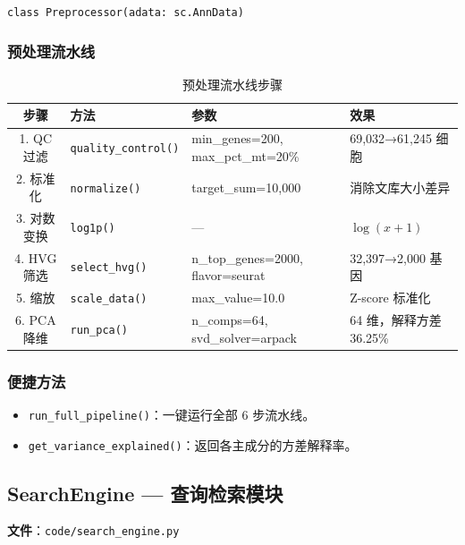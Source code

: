 \documentclass[12pt,a4paper]{ctexart}
\begin{document}
\texttt{class Preprocessor(adata: sc.AnnData)}

\subsubsection{预处理流水线}

\begin{table}[H]
\centering
\caption{预处理流水线步骤}
{\small
\begin{tabular}{c|l|l|p{4cm}}
\toprule
\textbf{步骤} & \textbf{方法} & \textbf{参数} & \textbf{效果} \\
\midrule
1. QC 过滤    & \texttt{quality\_control()} & {\small min\_genes=200, max\_pct\_mt=20\%} & 69,032→61,245 细胞 \\
2. 标准化     & \texttt{normalize()}        & {\small target\_sum=10,000}               & 消除文库大小差异 \\
3. 对数变换   & \texttt{log1p()}            & —                                          & $\log(x+1)$ \\
4. HVG 筛选   & \texttt{select\_hvg()}      & {\small n\_top\_genes=2000, flavor=seurat} & 32,397→2,000 基因 \\
5. 缩放       & \texttt{scale\_data()}       & {\small max\_value=10.0}                   & Z-score 标准化 \\
6. PCA 降维   & \texttt{run\_pca()}          & {\small n\_comps=64, svd\_solver=arpack}   & 64 维，解释方差 36.25\% \\
\bottomrule
\end{tabular}
}
\end{table}

\subsubsection{便捷方法}

\begin{itemize}
    \item \texttt{run\_full\_pipeline()}：一键运行全部 6 步流水线。
    \item \texttt{get\_variance\_explained()}：返回各主成分的方差解释率。
\end{itemize}

\subsection{SearchEngine — 查询检索模块}

\textbf{文件}：\texttt{code/search\_engine.py}
\end{document}
